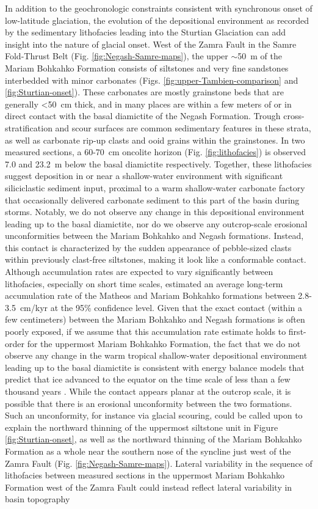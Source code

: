 In addition to the geochronologic constraints consistent with synchronous onset of low-latitude glaciation, the evolution of the depositional environment as recorded by the sedimentary lithofacies leading into the Sturtian Glaciation can add insight into the nature of glacial onset. West of the Zamra Fault in the Samre Fold-Thrust Belt (Fig. \ref{fig:Negash-Samre-maps}), the upper $\sim$50~m of the Mariam Bohkahko Formation consists of siltstones and very fine sandstones interbedded with minor carbonates (Figs. \ref{fig:upper-Tambien-comparison} and \ref{fig:Sturtian-onset}). These carbonates are mostly grainstone beds that are generally \textless50~cm thick, and in many places are within a few meters of or in direct contact with the basal diamictite of the Negash Formation. Trough cross-stratification and scour surfaces are common sedimentary features in these strata, as well as carbonate rip-up clasts and ooid grains within the grainstones. In two measured sections, a 60-70~cm oncolite horizon (Fig. \ref{fig:lithofacies}) is observed 7.0 and 23.2~m below the basal diamictite respectively. Together, these lithofacies suggest deposition in or near a shallow-water environment with significant siliciclastic sediment input, proximal to a warm shallow-water carbonate factory that occasionally delivered carbonate sediment to this part of the basin during storms. Notably, we do not observe any change in this depositional environment leading up to the basal diamictite, nor do we observe any outcrop-scale erosional unconformities between the Mariam Bohkahko and Negash formations. Instead, this contact is characterized by the sudden appearance of pebble-sized clasts within previously clast-free siltstones, making it look like a conformable contact. Although accumulation rates are expected to vary significantly between lithofacies, especially on short time scales, \citet{MacLennan2018a} estimated an average long-term accumulation rate of the Matheos and Mariam Bohkahko formations between 2.8-3.5~cm/kyr at the 95\% confidence level. Given that the exact contact (within a few centimeters) between the Mariam Bohkahko and Negash formations is often poorly exposed, if we assume that this accumulation rate estimate holds to first-order for the uppermost Mariam Bohkahko Formation, the fact that we do not observe any change in the warm tropical shallow-water depositional environment leading up to the basal diamictite is consistent with energy balance models that predict that ice advanced to the equator on the time scale of less than a few thousand years \citep{Baum2001a, Hoffman2002a, Pollard2005a}. While the contact appears planar at the outcrop scale, it is possible that there is an erosional unconformity between the two formations. Such an unconformity, for instance via glacial scouring, could be called upon to explain the northward thinning of the uppermost siltstone unit in Figure \ref{fig:Sturtian-onset}, as well as the northward thinning of the Mariam Bohkahko Formation as a whole near the southern nose of the syncline just west of the Zamra Fault (Fig. \ref{fig:Negash-Samre-maps}). Lateral variability in the sequence of lithofacies between measured sections in the uppermost Mariam Bohkahko Formation west of the Zamra Fault could instead reflect lateral variability in basin topography 